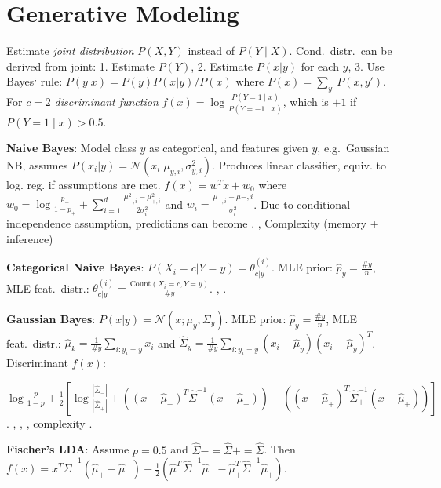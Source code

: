 \section{Generative Modeling}

Estimate \emph{joint distribution} $P(X,Y)$ instead of $P(Y \mid X)$. Cond.\
distr.\ can be derived from joint:  1. Estimate $P(Y)$, 2. Estimate $P(x|y)$ for each $y$, 3. Use Bayes‘ rule: $P(y|x) = P(y) P(x|y)/P(x)$ where $P(x) = \sum_{y'} P(x, y')$.  For $c=2$ \emph{discriminant function} $f(x)
= \log\frac{P(Y = 1 \mid x)}{P(Y = -1 \mid x)}$, which is $+1$ if $P(Y = 1 \mid x) > 0.5$.

\textbf{Naive Bayes}: Model class $y$ as categorical, and features \red{conditionally
independent} given $y$, e.g.\ Gaussian NB, assumes $P(x_i | y) =
\mathcal{N}(x_i | \mu_{y,i}, \sigma^2_{y,i})$. Produces linear classifier, equiv. to log. reg. if assumptions are met. $f(x) = w^T x + w_0$
where $w_0 = \log\frac{p_+}{1 - p_+} + \sum_{i=1}^d \frac{\mu_{-,i}^2 -
\mu_{+,i}^2}{2 \sigma_i^2}$ and $w_i = \frac{\mu_{+,i} - \mu{-,i}}{\sigma_i^2}$. Due to conditional independence assumption, predictions can become . , Complexity (memory + inference) 

\textbf{Categorical Naive Bayes}: $P(X_i =c|Y =y)=\theta^{(i)}_{c|y}$. MLE prior: $\hat{p}_y = \frac{\# y}{n}$, MLE feat.\ distr.: $\theta^{(i)}_{c|y} = \frac{\text{Count}(X_i = c, Y = y)}{\# y}$. , .

\textbf{Gaussian Bayes}: $P(x|y) = \mathcal{N}(x; \mu_y, \Sigma_y)$. MLE prior: $\hat{p}_y = \frac{\# y}{n}$, MLE feat.\ distr.: $\hat{\mu}_k = \frac{1}{\# y} \sum_{i: y_i = y} x_i$ and $\hat{\Sigma}_y = \frac{1}{\# y}
\sum_{i: y_i = y} (x_i - \hat{\mu}_y) (x_i - \hat{\mu}_y)^T$. Discriminant $f(x)$:

$\log\frac{p}{1-p} + \frac{1}{2}\left[\log\frac{|\hat{\Sigma}_-|}{|\hat{\Sigma}_+|} + \left( (x - \hat{\mu}_-)^T \hat{\Sigma}_-^{-1} (x-\hat{\mu}_-) \right) - \left( (x - \hat{\mu}_+)^T \hat{\Sigma}_+^{-1} (x-\hat{\mu}_+) \right) \right]$. , , , complexity .

\textbf{Fischer's LDA}: Assume $p = 0.5$ and $\hat{\Sigma}- = \hat{\Sigma}+ = \hat{\Sigma}$. Then $f(x) =
x^T \hat{\Sigma}^{-1} (\hat{\mu}_+ - \hat{\mu}_-)+ \frac{1}{2} \left( \hat{\mu}_-^T \hat{\Sigma}^{-1} \hat{\mu}_- -
\hat{\mu}_+^T \hat{\Sigma}^{-1} \hat{\mu}_+\right)$.

